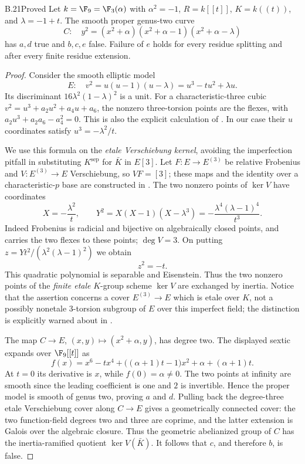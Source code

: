 \begin{claim}{B.21}{Proved}
Let $k=\F_9=\F_3(\alpha)$ with $\alpha^2=-1$, $R=k[[t]]$,
$K=k((t))$, and $\lambda=-1+t$. The smooth proper genus-two curve
\[
 C:\quad y^2=(x^2+\alpha)(x^2+\alpha-1)(x^2+\alpha-\lambda)
\]
has $a,d$ true and $b,c,e$ false. Failure of $e$ holds for every
residue splitting and after every finite residue extension.
\end{claim}
\begin{proof}
Consider the smooth elliptic model
\[
 E:\quad v^2=u(u-1)(u-\lambda)=u^3-tu^2+\lambda u.
\]
Its discriminant $16\lambda^2(1-\lambda)^2$ is a unit. For a
characteristic-three cubic $v^2=u^3+a_2u^2+a_4u+a_6$, the nonzero
three-torsion points are the flexes, with
$a_2u^3+a_2a_6-a_4^2=0$. This is also the explicit calculation of
\citet[Example 5.27]{BC_MoonenIsogs}. In our case their $u$ coordinates
satisfy $u^3=-\lambda^2/t$.

We use this formula on the \emph{etale Verschiebung kernel}, avoiding
the imperfection pitfall in substituting $K^{\mathrm{sep}}$ for $\bar K$
in $E[3]$. Let
$F:E\to E^{(3)}$ be relative Frobenius and
$V:E^{(3)}\to E$ Verschiebung, so $VF=[3]$; these maps and the
identity over a characteristic-$p$ base are constructed in
\citet[Definitions 5.18 and Propositions 5.19--5.20]{BC_MoonenIsogs}.
The two nonzero points of $\ker V$ have coordinates
\[
 X=-\frac{\lambda^2}{t},\qquad
 Y^2=X(X-1)(X-\lambda^3)
     =-\frac{\lambda^4(\lambda-1)^4}{t^3}.
\]
Indeed Frobenius is radicial and bijective on algebraically closed
points, and carries the two flexes to these points; $\deg V=3$.
On putting $z=Yt^2/(\lambda^2(\lambda-1)^2)$ we obtain
\[
 z^2=-t.
\]
This quadratic polynomial is separable and Eisenstein. Thus the two
nonzero points of the \emph{finite etale} $K$-group scheme $\ker V$
are exchanged by inertia. Notice that the assertion concerns a cover
$E^{(3)}\to E$ which is etale over $K$, not a possibly nonetale
$3$-torsion subgroup of $E$ over this imperfect field; the distinction
is explicitly warned about in \citet[Caution 5.24]{BC_MoonenIsogs}.

The map $C\to E$, $(x,y)\mapsto(x^2+\alpha,y)$, has degree two.
The displayed sextic expands over $\F_9[[t]]$ as
\[
 f(x)=x^6-tx^4+\bigl((\alpha+1)t-1\bigr)x^2
                  +\alpha+(\alpha+1)t.
\]
At $t=0$ its derivative is $x$, while $f(0)=\alpha\ne0$.
The two points at infinity are smooth since the leading coefficient
is one and $2$ is invertible. Hence the proper model is smooth of genus
two, proving $a$ and $d$.
Pulling back the degree-three etale Verschiebung cover along $C\to E$
gives a geometrically connected cover: the two function-field degrees
two and three are coprime, and the latter extension is Galois over
the algebraic closure. Thus the geometric abelianized group of $C$
has the inertia-ramified quotient $\ker V(\bar K)$.
It follows that $c$, and therefore $b$, is false.


\end{proof}
